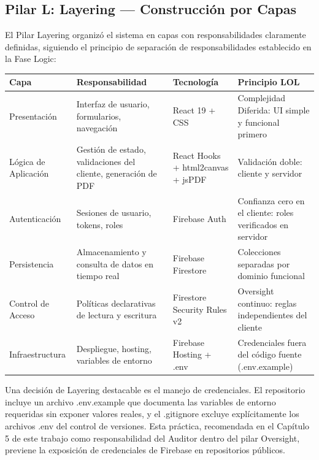 \documentclass[14pt,a4paper,oneside]{extbook}
\begin{document}
\subsection{Pilar L: Layering — Construcción por Capas}

El Pilar Layering organizó el sistema en capas con responsabilidades claramente definidas, siguiendo el principio de separación de responsabilidades establecido en la Fase Logic:

\begin{table}[htbp]
\centering
\begin{tabular}{p{} p{} p{} p{}}
\toprule
\textbf{Capa} & \textbf{Responsabilidad} & \textbf{Tecnología} & \textbf{Principio LOL} \\
\midrule
Presentación & Interfaz de usuario, formularios, navegación & React 19 + CSS & Complejidad Diferida: UI simple y funcional primero \\
Lógica de Aplicación & Gestión de estado, validaciones del cliente, generación de PDF & React Hooks + html2canvas + jsPDF & Validación doble: cliente y servidor \\
Autenticación & Sesiones de usuario, tokens, roles & Firebase Auth & Confianza cero en el cliente: roles verificados en servidor \\
Persistencia & Almacenamiento y consulta de datos en tiempo real & Firebase Firestore & Colecciones separadas por dominio funcional \\
Control de Acceso & Políticas declarativas de lectura y escritura & Firestore Security Rules v2 & Oversight continuo: reglas independientes del cliente \\
Infraestructura & Despliegue, hosting, variables de entorno & Firebase Hosting + .env & Credenciales fuera del código fuente (.env.example) \\
\bottomrule
\end{tabular}
\end{table}

Una decisión de Layering destacable es el manejo de credenciales. El repositorio incluye un archivo .env.example que documenta las variables de entorno requeridas sin exponer valores reales, y el .gitignore excluye explícitamente los archivos .env del control de versiones. Esta práctica, recomendada en el Capítulo 5 de este trabajo como responsabilidad del Auditor dentro del pilar Oversight, previene la exposición de credenciales de Firebase en repositorios públicos.
\end{document}

